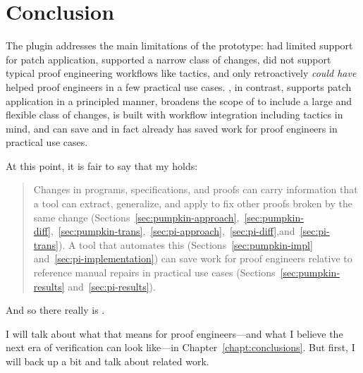 \section{Conclusion}
\label{sec:pi-concl}

The \toolnamec plugin addresses the main limitations of the \sysname prototype:
\sysname had limited support for patch application,
supported a narrow class of changes,
did not support typical proof engineering workflows like tactics,
and only retroactively \textit{could have} helped proof engineers in a few practical use cases.
\toolnamec, in contrast, supports patch application in a principled manner,
broadens the scope of \sysnamelong to include a large and flexible class of changes,
is built with workflow integration including tactics in mind,
and can save and in fact already has saved work for proof engineers in practical use cases.

At this point, it is fair to say that my  holds:

\begin{quote}
Changes in programs, specifications, and proofs can carry information that a tool can extract, generalize, and apply to fix other proofs broken by the same change (Sections~\ref{sec:pumpkin-approach},~\ref{sec:pumpkin-diff},~\ref{sec:pumpkin-trans},~\ref{sec:pi-approach},~\ref{sec:pi-diff},and~\ref{sec:pi-trans}). A tool that automates this (Sections~\ref{sec:pumpkin-impl} and~\ref{sec:pi-implementation}) can save work for proof engineers relative to reference manual repairs in 
practical use cases (Sections~\ref{sec:pumpkin-results} and~\ref{sec:pi-results}).
\end{quote}
And so there really is .

I will talk about what that means for proof engineers---and what I believe the next era of verification can look like---in Chapter~\ref{chapt:conclusions}.
But first, I will back up a bit and talk about related work.
